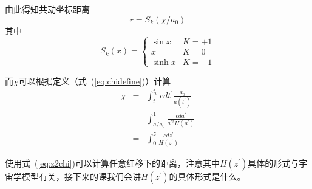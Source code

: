 \documentclass[12pt]{ctexart}
\newcommand{\refeq}[1]{式~(\ref{#1})}
\begin{document}
由此得知共动坐标距离
\begin{equation}
    r = S_k(\chi/a_0)
\end{equation}
其中
\begin{equation}
    S_k(x) = 
    \begin{cases}
        \sin{x} & K=+1 \\ 
        x & K=0 \\ 
        \sinh{x}  & K=-1
    \end{cases}
\end{equation}

而$\chi$可以根据定义（\refeq{eq:chidefine}）计算
\begin{eqnarray}
    \chi &=& \int_t^{t_0} c dt^\prime \frac{a_0}{a(t^\prime)} \\
        &=& \int_{a/a_0}^{1}  \frac{c da^\prime}{a^{\prime 2}H(a^\prime)} \\
        &=& \int_{0}^{z}  \frac{c dz^\prime}{H(z^\prime)} \label{eq:z2chi}
\end{eqnarray}

使用\refeq{eq:z2chi}可以计算任意红移下的距离，注意其中$H(z^\prime)$具体的形式与宇宙学模型有关，接下来的课我们会讲$H(z^\prime)$的具体形式是什么。
\end{document}
